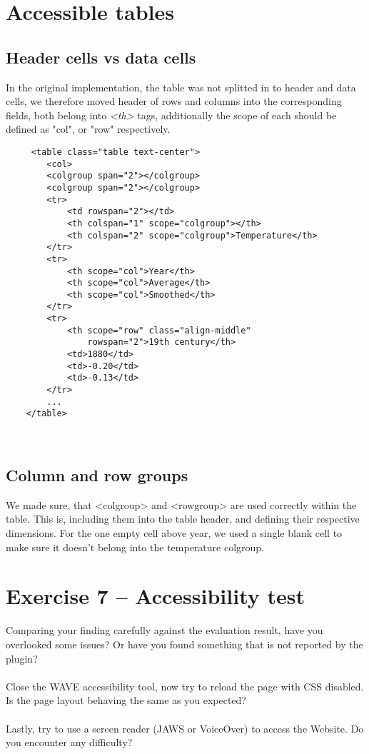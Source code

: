 \documentclass[a4paper,11pt]{article}
\theoremstyle{mytheor}
\begin{document}
\section{Accessible tables}
\subsection{Header cells vs data cells}
In the original implementation, the table was not splitted in to header and data cells, we therefore
moved header of rows and columns into the corresponding fields, both belong into \emph{<th>} tags, additionally the scope of each should be defined as "col", or "row" respectively. 

\begin{verbatim}
     <table class="table text-center">
        <col>
        <colgroup span="2"></colgroup>
        <colgroup span="2"></colgroup>
        <tr>
            <td rowspan="2"></td>
            <th colspan="1" scope="colgroup"></th>
            <th colspan="2" scope="colgroup">Temperature</th>
        </tr>
        <tr>
            <th scope="col">Year</th>
            <th scope="col">Average</th>
            <th scope="col">Smoothed</th>
        </tr>
        <tr>
            <th scope="row" class="align-middle" 
                rowspan="2">19th century</th>
            <td>1880</td>
            <td>-0.20</td>
            <td>-0.13</td>
        </tr>
        ...
    </table>
\end{verbatim}\\

\subsection{Column and row groups}
We made sure, that <colgroup> and <rowgroup> are used correctly within the table. This is, including them into the table header, and defining their respective dimensions. For the one empty cell above year, we used a single blank cell to make sure it doesn't belong into the temperature colgroup. 



\section{Exercise 7 – Accessibility test}
Comparing your
finding carefully against the evaluation result, have you overlooked some issues? Or have you found something that is not reported by the plugin?\\
\\
Close the WAVE accessibility tool, now try to reload the page with CSS disabled. Is the page layout behaving the same as you expected?\\
\\
Lastly, try to use a screen reader (JAWS or VoiceOver) to access the Website. Do you encounter any difficulty?\\



\printbibliography
\end{document}
